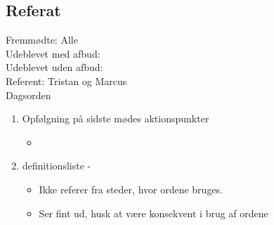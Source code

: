  \subsection{Referat}
 Fremmødte: Alle
 \\Udeblevet med afbud: 
 \\Udeblevet uden afbud:
 \\Referent: Tristan og Marcus
 \\Dagsorden 
 \begin{enumerate}
    \item Opfølgning på sidste mødes aktionspunkter 
    \begin{itemize}
        \item 
    \end{itemize}
    \item  definitionsliste -
    \begin{itemize}
        \item Ikke referer fra steder, hvor ordene bruges.
        \item Ser fint ud, husk at være konsekvent i brug af ordene
    \end{itemize}
    

\end{enumerate}
